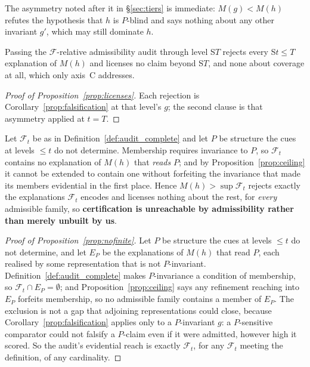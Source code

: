 \noindent The asymmetry noted after it in \S\ref{sec:tiers} is immediate: $M(g)<M(h)$ refutes the hypothesis that $h$ is $P$-blind and says nothing about any other invariant $g'$, which may still dominate $h$.

\begin{proposition}
\label{prop:licenses}
Passing the $\mathcal{F}$-relative admissibility audit through level S$T$ rejects every S$t{\leq}T$ explanation of $M(h)$ and licenses no claim beyond S$T$, and none about coverage at all, which only axis~C addresses.
\end{proposition}

\begin{proof}[Proof of Proposition~\ref{prop:licenses}]
Each rejection is Corollary~\ref{prop:falsification} at that level's $g$; the second clause is that asymmetry applied at $t{=}T$.
\end{proof}

\begin{proposition}
\label{prop:nofinite}
Let $\mathcal{F}_t$ be as in Definition~\ref{def:audit_complete} and let $P$ be structure the cues at levels ${\leq}t$ do not determine. Membership requires invariance to $P$, so $\mathcal{F}_t$ contains no explanation of $M(h)$ that \emph{reads} $P$; and by Proposition~\ref{prop:ceiling} it cannot be extended to contain one without forfeiting the invariance that made its members evidential in the first place. Hence $M(h)>\sup\mathcal{F}_t$ rejects exactly the explanations $\mathcal{F}_t$ encodes and licenses nothing about the rest, for \emph{every} admissible family, so \textbf{certification is unreachable by admissibility rather than merely unbuilt by us}.
\end{proposition}

\begin{proof}[Proof of Proposition~\ref{prop:nofinite}]
Let $P$ be structure the cues at levels ${\leq}t$ do not determine, and let $E_P$ be the explanations of $M(h)$ that read $P$, each realised by some representation that is not $P$-invariant. Definition~\ref{def:audit_complete} makes $P$-invariance a condition of membership, so $\mathcal{F}_t\cap E_P=\emptyset$; and Proposition~\ref{prop:ceiling} says any refinement reaching into $E_P$ forfeits membership, so no admissible family contains a member of $E_P$. The exclusion is not a gap that adjoining representations could close, because Corollary~\ref{prop:falsification} applies only to a $P$-invariant $g$: a $P$-sensitive comparator could not falsify a $P$-claim even if it were admitted, however high it scored. So the audit's evidential reach is exactly $\mathcal{F}_t$, for any $\mathcal{F}_t$ meeting the definition, of any cardinality.
\end{proof}

